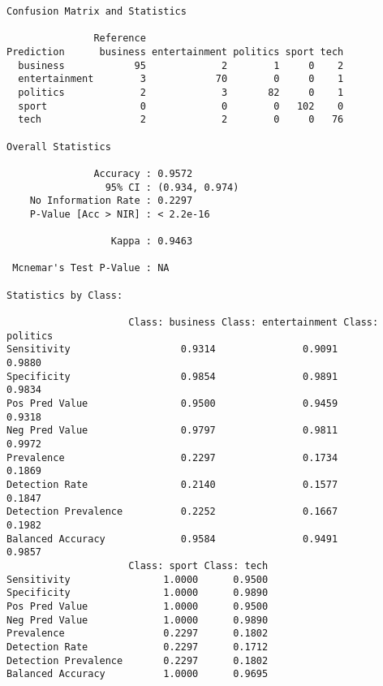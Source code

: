 \documentclass[
  12pt,
  letterpaper,
  DIV=11,
  numbers=noendperiod]{scrartcl}
\newenvironment{Shaded}{\begin{snugshade}}{\end{snugshade}}
\newcommand{\CommentTok}[1]{\textcolor[rgb]{0.37,0.37,0.37}{#1}}
\newcommand{\FunctionTok}[1]{\textcolor[rgb]{0.28,0.35,0.67}{#1}}
\newcommand{\NormalTok}[1]{\textcolor[rgb]{0.00,0.23,0.31}{#1}}
\newcommand{\OtherTok}[1]{\textcolor[rgb]{0.00,0.23,0.31}{#1}}
\newcommand{\SpecialCharTok}[1]{\textcolor[rgb]{0.37,0.37,0.37}{#1}}
\newcommand{\StringTok}[1]{\textcolor[rgb]{0.13,0.47,0.30}{#1}}
\begin{document}
\begin{verbatim}
Confusion Matrix and Statistics

               Reference
Prediction      business entertainment politics sport tech
  business            95             2        1     0    2
  entertainment        3            70        0     0    1
  politics             2             3       82     0    1
  sport                0             0        0   102    0
  tech                 2             2        0     0   76

Overall Statistics
                                        
               Accuracy : 0.9572        
                 95% CI : (0.934, 0.974)
    No Information Rate : 0.2297        
    P-Value [Acc > NIR] : < 2.2e-16     
                                        
                  Kappa : 0.9463        
                                        
 Mcnemar's Test P-Value : NA            

Statistics by Class:

                     Class: business Class: entertainment Class: politics
Sensitivity                   0.9314               0.9091          0.9880
Specificity                   0.9854               0.9891          0.9834
Pos Pred Value                0.9500               0.9459          0.9318
Neg Pred Value                0.9797               0.9811          0.9972
Prevalence                    0.2297               0.1734          0.1869
Detection Rate                0.2140               0.1577          0.1847
Detection Prevalence          0.2252               0.1667          0.1982
Balanced Accuracy             0.9584               0.9491          0.9857
                     Class: sport Class: tech
Sensitivity                1.0000      0.9500
Specificity                1.0000      0.9890
Pos Pred Value             1.0000      0.9500
Neg Pred Value             1.0000      0.9890
Prevalence                 0.2297      0.1802
Detection Rate             0.2297      0.1712
Detection Prevalence       0.2297      0.1802
Balanced Accuracy          1.0000      0.9695
\end{verbatim}

\begin{Shaded}
\end{Shaded}
\end{document}
